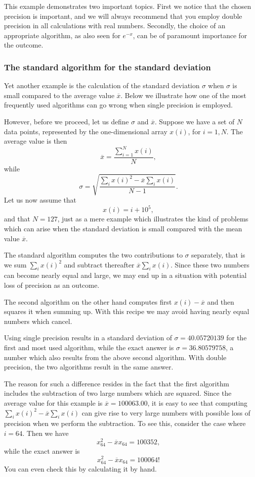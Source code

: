 This example demonstrates two important topics.
First we notice that the chosen precision is important,
and we will always recommend that you employ double precision
in all calculations with real numbers. 
Secondly, the choice of an appropriate algorithm, as also seen 
for $e^{-x}$, can be of paramount importance for the
outcome.  


\subsubsection{The standard algorithm for the standard deviation}

Yet another example is the calculation of the standard deviation
$\sigma$ when $\sigma$ is small compared to the average value 
$\overline{x}$. 
Below we illustrate how one of the most frequently used 
algorithms can go wrong when single precision is employed.

However, before we proceed, let us define $\sigma$ and 
$\overline{x}$.
Suppose we have a set of $N$ data points, 
represented by the one-dimensional
array $x(i)$, for $i=1, N$. The average value is then 
\[
   \overline{x}=\frac{\sum_{i=1}^{N}x(i)}{N},
\]
while
\[
   \sigma=\sqrt{\frac{\sum_i x(i)^2-\overline{x}\sum_ix(i)}{N-1}}.
\]
Let us now assume that 
\[
   x(i)=i+10^5,
\] 
and that $N=127$, just as a mere example which illustrates 
the kind of problems which can arise when the standard deviation
is small compared with the mean value $\overline{x}$. 

The standard algorithm computes  the two contributions to $\sigma$ separately, that
is we sum $\sum_i x(i)^2$ and subtract thereafter $\overline{x}\sum_ix(i)$.
Since these two numbers can become nearly equal and large, we may end 
up in a situation with potential loss of precision as an outcome.

The second algorithm on the other hand computes first 
$x(i)-\overline{x}$ and then squares it when summing up.  With this recipe we may avoid
having nearly equal numbers which cancel.


Using single precision results in a standard deviation of
$\sigma = 40.05720139 $ for the first and most used algorithm, while the exact
answer is $\sigma = 36.80579758 $, a number which also results from
the above second algorithm. 
With double precision, the two algorithms result in the same answer. 

The reason for such a difference resides in the fact that the first
algorithm includes the 
subtraction of two large numbers which are squared. Since the 
average value for this example is
$\overline{x}=100063.00$, it is easy to see that computing 
$\sum_i x(i)^2-\overline{x}\sum_ix(i)$ can give rise to very large
numbers with possible loss of precision when we perform the 
subtraction. 
To see this, consider the case where $i=64$. Then we have
\[
   x_{64}^2-\overline{x}x_{64}=100352,
\]
while the exact answer is 
\[
   x_{64}^2-\overline{x}x_{64}=100064!
\]
You  can even check this by calculating it by hand. 

